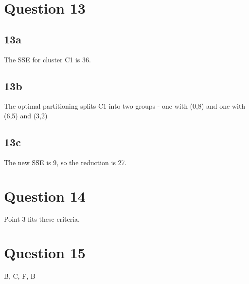\documentclass{article}
\begin{document}
\section{Question 13}

\subsection{13a}
The SSE for cluster C1 is 36.

\subsection{13b}
The optimal partitioning splits C1 into two groups - one with (0,8) and one with (6,5) and (3,2)

\subsection{13c}
The new SSE is 9, so the reduction is 27.

\section{Question 14}
Point 3 fits these criteria.

\section{Question 15}
B, C, F, B
\end{document}
